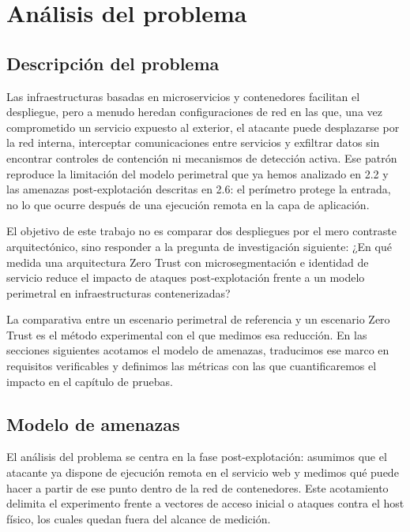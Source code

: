 \documentclass[11pt,spanish,listoffigures,listoftables]{tfgetsinf}
\begin{document}

\chapter{Análisis del problema}
 
    \section{Descripción del problema}
    Las infraestructuras basadas en microservicios y contenedores facilitan el despliegue, pero a menudo heredan configuraciones de red en las que, una vez comprometido un servicio expuesto al exterior, el atacante puede desplazarse por la red interna, interceptar comunicaciones entre servicios y exfiltrar datos sin encontrar controles de contención ni mecanismos de detección activa. Ese patrón reproduce la limitación del modelo perimetral que ya hemos analizado en 2.2 y las amenazas post-explotación descritas en 2.6: el perímetro protege la entrada, no lo que ocurre después de una ejecución remota en la capa de aplicación.
    
    El objetivo de este trabajo no es comparar dos despliegues por el mero contraste arquitectónico, sino responder a la pregunta de investigación siguiente: ¿En qué medida una arquitectura Zero Trust con microsegmentación e identidad de servicio reduce el impacto de ataques post-explotación frente a un modelo perimetral en infraestructuras contenerizadas?
    
    La comparativa entre un escenario perimetral de referencia y un escenario Zero Trust es el método experimental con el que medimos esa reducción. En las secciones siguientes acotamos el modelo de amenazas, traducimos ese marco en requisitos verificables y definimos las métricas con las que cuantificaremos el impacto en el capítulo de pruebas.
    
    
    \section{Modelo de amenazas}
    El análisis del problema se centra en la fase post-explotación: asumimos que el atacante ya dispone de ejecución remota en el servicio web y medimos qué puede hacer a partir de ese punto dentro de la red de contenedores. Este acotamiento delimita el experimento frente a vectores de acceso inicial o ataques contra el host físico, los cuales quedan fuera del alcance de medición.
\end{document}
